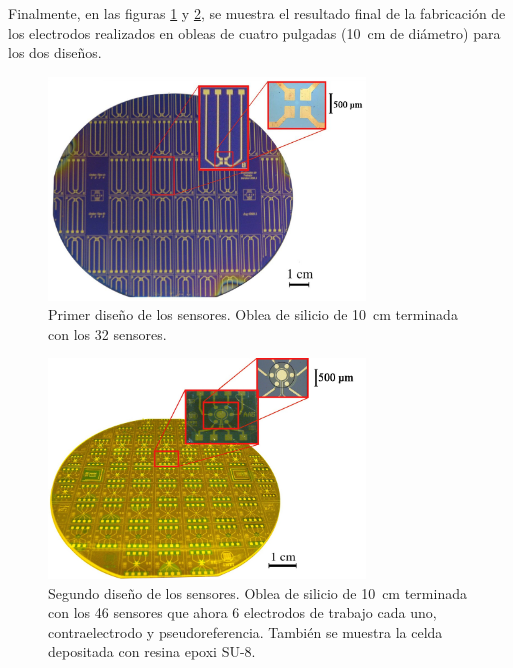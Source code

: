		 Finalmente, en las figuras \ref{fig:ObleaV1} y \ref{fig:ObleaV2}, se muestra el resultado final de la fabricación de los electrodos realizados en obleas de cuatro pulgadas (\SI{10}{\cm} de diámetro) para los dos diseños.

					  \begin{figure}[ht!]
					  \begin{center}
					  \includegraphics[width=0.75\textwidth]{Imagenes/ObleaV1.jpg}
					  \caption[Electrodos, primera versión]{Primer diseño de los sensores. Oblea de silicio de \SI{10}{cm} terminada con los 32 sensores.}
					  \label{fig:ObleaV1}
					  \end{center}
					  \end{figure} 	

					  \begin{figure}[ht!]
					  \begin{center}
					  \includegraphics[width=0.75\textwidth]{Imagenes/ObleaV2.jpg}
					  \caption[Electrodos, segunda versión]{Segundo diseño de los sensores. Oblea de silicio de \SI{10}{cm} terminada con los 46 sensores que ahora 6 electrodos de trabajo cada uno, contraelectrodo y pseudoreferencia. También se muestra la celda depositada con resina epoxi SU-8.}
					  \label{fig:ObleaV2}
					  \end{center}
					  \end{figure} 	
		
